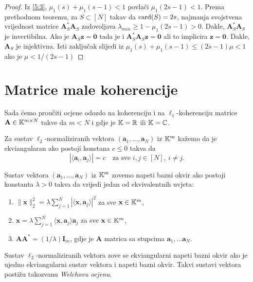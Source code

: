 \documentclass[a4paper,twoside,12pt]{memoir} %
\newcommand{\vect}[1]{\mathbf{#1}}
\renewcommand{\vec}{\vect}
\newcommand{\card}{\text{\normalfont{card}}}
\newcommand{\norm}[1]{\|{#1}\|}
\begin{document}
\begin{proof}
    Iz \eqref{5:3}, $\mu_1(s) + \mu_1(s-1) < 1$ povla\v{c}i $\mu_1(2s-1) < 1$. Prema prethodnom teoremu, za $S \subset [N]$ takav da $\card(S) = 2s$, najmanja svojstvena vrijednost matrice $\vec A^*_S \vec A_S$ zadovoljava $\lambda_{min} \geq 1 - \mu_1(2s-1)>0$. Dakle, $\vec A^*_S \vec A_S$ je invertibilna. Ako je $\vec A_S \vec z = \vec 0$ tada je i $\vec A^*_S \vec A_S \vec z = \vec 0$ ali to implicira $\vec z = \vec 0$. Dakle, $\vec A_S$ je injektivna. Isti zaklju\v{c}ak slijedi iz $\mu_1(s) + \mu_1(s-1) \leq (2s-1)\mu < 1$ ako je $\mu < 1/(2s-1)$
\end{proof}

\section[Matrice male koherencije][Matrice male koherencije]{Matrice male koherencije}
Sada \'cemo prou\v{c}iti ocjene odozdo na koherenciju i na $\ell_1$-koherenciju matrice $\vec A \in \K^{m \times N}$ takve da $m < N$ i gdje je $\mathbb{K} = \mathbb{R}$ ili $\mathbb{K} = \mathbb{C}$.
\begin{defn}
    Za sustav $\ell_2$-normaliziranih vektora $(\vec a_1, \dots, \vec a_N)$ iz $\mathbb{K}^m$ ka\v{z}emo da je ekviangularan ako postoji konstana $c \leq 0$ takva da
    \begin{equation*}
        |\langle \vec a_i, \vec a_j \rangle|  = c \quad \text{za sve } i,j \in [N],\ i \neq j.
    \end{equation*}
\end{defn}
\begin{defn}
    Sustav  vektora $(\vec a_1, \dots, \vec a_N)$ iz $\mathbb{K}^m$ zovemo napeti bazni okvir ako postoji konstanta $\lambda > 0$ takva da vrijedi jedan od ekvivalentnih uvjeta:
    \begin{enumerate}[label=(\alph*)]
        \item $\norm{\vec x}_2^2 = \lambda \sum_{j=1}^N |\langle \vec x, \vec a_j \rangle|^2$ za sve $\vec x \in \K^m$,
        \item $\vec{x} = \lambda \sum_{j=1}^N \langle \vec x, \vec a_j\rangle \vec a_j$  za sve $\vec x \in \K^m$,
        \item $\vec{AA}^* = (1/\lambda) \vec I_m$, gdje je $\vec A$ matrica sa stupcima $\vec a_1, \dots \vec a_N$.
    \end{enumerate}
\end{defn}
Sustav $\ell_2$-normaliziranih vektora zove se ekviangularni napeti bazni okvir ako je ujedno ekviangularni sustav vektora i napeti bazni okvir. Takvi sustavi vektora posti\v{z}u takozvanu \textit{Welchovu ocjenu}.
\end{document}
